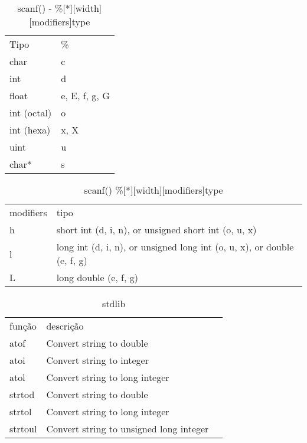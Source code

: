 \documentclass[a4paper,twocolumn, 10pt, landscape]{article}
\begin{document}
\begin{table}
\begin{tabular}{ll}
Tipo & \% \\ 
char & c \\ 
int & d \\ 
float & e, E, f, g, G \\ 
int (octal) & o \\ 
int (hexa) & x, X \\ 
uint & u \\ 
char* & s
\end{tabular}
\caption{scanf() - \%[*][width][modifiers]type}
\label{tipos}
\end{table}

\begin{table}
 \begin{tabular}{ll}
modifiers & tipo \\ 
h & short int (d, i, n), or unsigned short int (o, u, x) \\ 
l & long int (d, i, n), or unsigned long int (o, u, x), or double (e, f, g) \\ 
L & long double (e, f, g) \\ 
\end{tabular}
\caption{scanf() \%[*][width][modifiers]type}
\label{modifiers}
\end{table}


\begin{table}
 \begin{tabular}{lll}
função & descrição \\
atof & Convert string to double \\
atoi & Convert string to integer \\
atol & Convert string to long integer \\
strtod & Convert string to double \\
strtol & Convert string to long integer \\
strtoul & Convert string to unsigned long integer \\
\end{tabular}
\caption{stdlib}
\label{stdlib functions}
\end{table}
\end{document}
